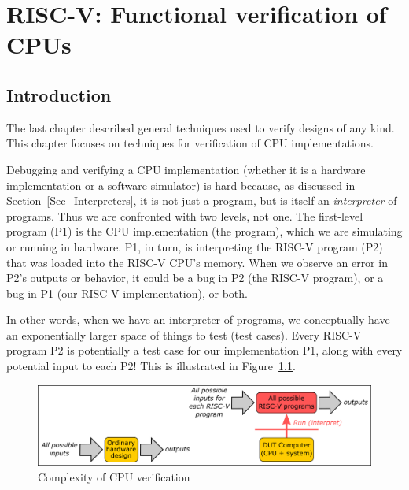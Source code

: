 

\chapter{RISC-V: Functional verification of CPUs}


\setcounter{page}{1}
\renewcommand{\thepage}{\arabic{chapter}-\arabic{page}}

\label{ch_RISCV_verification}


\section{Introduction}

\label{Sec_RISCV_verification_intro}

The last chapter described general techniques used to verify {\BSV}
designs of any kind.  This chapter focuses on techniques for
verification of CPU implementations.

Debugging and verifying a CPU implementation (whether it is a hardware
implementation or a software simulator) is hard because, as discussed
in Section~\ref{Sec_Interpreters}, it is not just a program, but is
itself an \emph{interpreter} of programs.  Thus we are confronted with
two levels, not one.  The first-level program (P1) is the CPU
implementation (the {\BSV} program), which we are simulating or running
in hardware.  P1, in turn, is interpreting the RISC-V program (P2)
that was loaded into the RISC-V CPU's memory. When we observe an error
in P2's outputs or behavior, it could be a bug in P2 (the RISC-V
program), or a bug in P1 (our RISC-V implementation), or both.

In other words, when we have an interpreter of programs, we
conceptually have an exponentially larger space of things to test
(test cases).  Every RISC-V program P2 is potentially a test case for
our implementation P1, along with every potential input to each P2!
This is illustrated in Figure~\ref{Fig_CPU_Verif_Complexity}.
\begin{figure}[htbp]
  \centerline{\includegraphics[width=6in,angle=0]{Figures/Fig_CPU_Verif_Complexity}}
  \caption{\label{Fig_CPU_Verif_Complexity}
           Complexity of CPU verification}
\end{figure}

